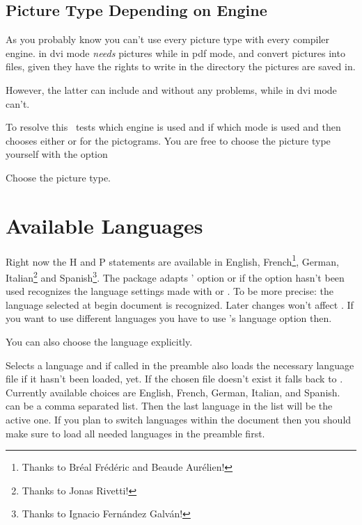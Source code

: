 \documentclass[load-preamble+]{cnltx-doc}
\begin{document}
\subsection{Picture Type Depending on Engine}\label{ssec:picture_type}
As you probably know you can't use every picture type with every compiler
engine.  \pdfTeX{} in \acs{dvi} mode \emph{needs}  pictures while
\pdfTeX{} in \acs{pdf} mode, \XeTeX{} and \LuaTeX{} convert 
pictures into  files, given they have the rights to write in the
directory the pictures are saved in.

However, the latter can include  and  without any
problems, while \pdfTeX{} in \acs{dvi} mode can't.

To resolve this \ghsystem\ tests which engine is used and if \pdfTeX{} which
mode is used and then chooses either  or  for the
pictograms.  You are free to choose the picture type yourself with the option
\begin{options}
    Choose the picture type.
\end{options}

\section{Available Languages}\label{sec:ghsystem_language}
Right now the H and P statements are available in English,
French\footnote{Thanks to Bréal Frédéric and Beaude Aurélien!}, German,
Italian\footnote{Thanks to Jonas Rivetti!} and Spanish\footnote{Thanks to
  Ignacio Fernández Galván!}.  The package adapts ' option
 or if the option hasn't been used recognizes the language
settings made with  or .  To be more precise: the
language selected at begin document is recognized.  Later changes won't affect
\ghsystem.  If you want to use different languages you have to use \ghsystem's
language option then.

You can also choose the language explicitly.
\begin{options}
    Selects a language and if called in the preamble also loads the necessary
    language file if it hasn't been loaded, yet.  If the chosen file doesn't
    exist it falls back to  .  Currently available choices are
    English, French, German, Italian, and Spanish.   can be a comma
    separated list.  Then the last language in the list will be the active
    one.  If you plan to switch languages within the document then you should
    make sure to load all needed languages in the preamble first.
\end{options}
\begin{example}

\end{example}
\end{document}

